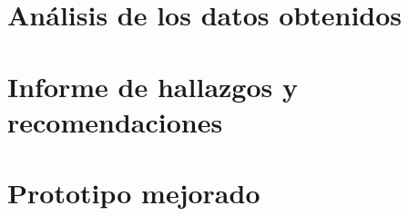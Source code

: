 








\section{Análisis de los datos obtenidos}

\section{Informe de hallazgos y recomendaciones}



\section{Prototipo mejorado}
